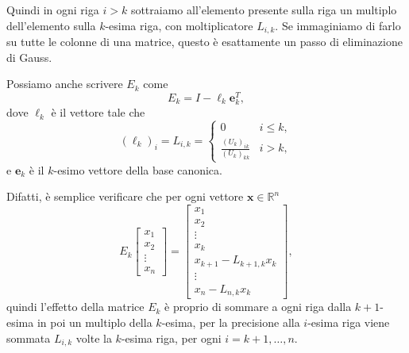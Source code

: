 \documentclass[a4paper]{report}
\theoremstyle{definition}
\theoremstyle{remark}
\newcommand{\x}{\mathbf{x}}
\begin{document}
Quindi in ogni riga $i>k$ sottraiamo all'elemento presente sulla riga un multiplo dell'elemento sulla $k$-esima riga, con moltiplicatore $L_{i,k}$. Se immaginiamo di farlo su tutte le colonne di una matrice, questo è esattamente un passo di eliminazione di Gauss.

Possiamo anche scrivere $E_k$ come
\[
E_k = I - \boldsymbol{\ell}_k \mathbf{e}_k^T,
\]
dove $\boldsymbol{\ell}_k$ è il vettore tale che 
\[
(\boldsymbol{\ell}_k)_i = L_{i,k} = \begin{cases}
0 & i \leq k,\\
\frac{(U_k)_{ik}}{(U_k)_{kk}} & i>k,
\end{cases}
\]
e $\mathbf{e}_k$ è il $k$-esimo vettore della base canonica.

Difatti, è semplice verificare che per ogni vettore $\x\in\mathbb{R}^n$ 
\[
E_k \begin{bmatrix}
    x_1\\x_2\\ \vdots \\ x_n
\end{bmatrix}
=
\begin{bmatrix}
    x_1 \\ x_2\\ \vdots \\ x_k \\ x_{k+1} - L_{k+1,k}x_k\\
    \vdots \\
    x_n - L_{n,k}x_k
\end{bmatrix},
\]
quindi l'effetto della matrice $E_k$ è proprio di sommare a ogni riga dalla $k+1$-esima in poi un multiplo della $k$-esima, per la precisione alla $i$-esima riga viene sommata $L_{i,k}$ volte la $k$-esima riga, per ogni $i=k+1,\dots,n$.
\end{document}
